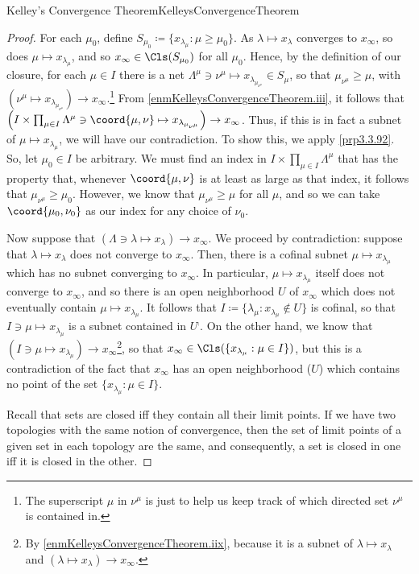 \begin{thm}{Kelley's Convergence Theorem}{KelleysConvergenceTheorem}
\begin{proof}
For each $\mu _0$, define $S_{\mu _0}\coloneqq \{ x_{\lambda _\mu}:\mu \geq \mu _0\}$.  As $\lambda \mapsto x_\lambda$ converges to $x_\infty$, so does $\mu \mapsto x_{\lambda _\mu}$, and so $x_\infty \in \Cls (S_{\mu _0})$ for all $\mu _0$.  Hence, by the definition of our closure, for each $\mu \in I$ there is a net $\Lambda ^{\mu}\ni \nu ^{\mu}\mapsto x_{\lambda _{\mu _{\nu ^{\mu}}}}\in S_{\mu}$, so that $\mu _{\nu ^{\mu}}\geq \mu$, with $\left( \nu ^{\mu}\mapsto x_{\lambda _{\mu _{\nu ^{\mu}}}}\right) \to x_\infty$.\footnote{The superscript $\mu$ in $\nu ^{\mu}$ is just to help us keep track of which directed set $\nu ^{\mu}$ is contained in.}  From \cref{enmKelleysConvergenceTheorem.iii}, it follows that $\left( I\times \prod _{\mu \in I}\Lambda ^{\mu}\ni \coord{\mu ,\nu}\mapsto x_{\lambda _{\mu _{\nu ^{\mu}}}}\right) \to x_\infty$.  Thus, if this is in fact a subnet of $\mu \mapsto x_{\lambda _\mu}$, we will have our contradiction.  To show this, we apply \cref{prp3.3.92}.  So, let $\mu _0\in I$ be arbitrary.  We must find an index in $I\times \prod _{\mu \in I}\Lambda ^{\mu}$ that has the property that, whenever $\coord{\mu ,\nu}$ is at least as large as that index, it follows that $\mu _{\nu ^{\mu}}\geq \mu _0$.  However, we know that $\mu _{\nu ^{\mu}}\geq \mu$ for all $\mu$, and so we can take $\coord{\mu _0,\nu _0}$ as our index for any choice of $\nu _0$.

Now suppose that $(\Lambda \ni \lambda \mapsto x_\lambda )\to x_\infty$.  We proceed by contradiction:  suppose that $\lambda \mapsto x_\lambda$ does not converge to $x_\infty$.  Then, there is a cofinal subnet $\mu \mapsto x_{\lambda _\mu}$ which has no subnet converging to $x_\infty$.  In particular, $\mu \mapsto x_{\lambda _\mu}$ itself does not converge to $x_\infty$, and so there is an open neighborhood $U$ of $x_\infty$ which does not eventually contain $\mu \mapsto x_{\lambda _\mu}$.  It follows that $I\coloneqq \{ \lambda _\mu :x_{\lambda _\mu}\notin U\}$ is cofinal, so that $I\ni \mu \mapsto x_{\lambda _\mu}$ is a subnet contained in $U^{\comp}$.  On the other hand, we know that $(I\ni \mu \mapsto x_{\lambda _\mu})\to x_\infty$\footnote{By \cref{enmKelleysConvergenceTheorem.iix}, because it is a subnet of $\lambda \mapsto x_{\lambda}$ and $(\lambda \mapsto x_{\lambda})\to x_{\infty}$.}, so that $x_\infty \in \Cls (\{ x_{\lambda _\mu}:\mu \in I\})$, but this is a contradiction of the fact that $x_{\infty}$ has an open neighborhood ($U$) which contains no point of the set $\{ x_{\lambda _{\mu}}:\mu \in I\}$.

Recall that sets are closed iff they contain all their limit points.  If we have two topologies with the same notion of convergence, then the set of limit points of a given set in each topology are the same, and consequently, a set is closed in one iff it is closed in the other.
\end{proof}
\end{thm}
